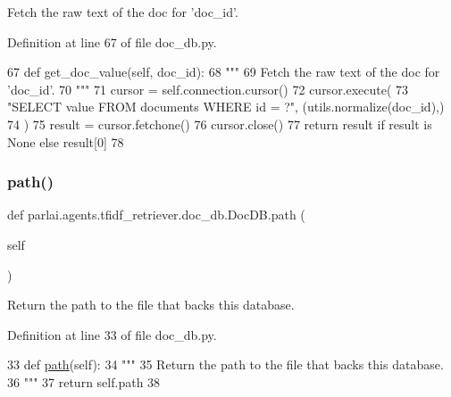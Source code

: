 \begin{DoxyVerb}Fetch the raw text of the doc for 'doc_id'.
\end{DoxyVerb}
 

Definition at line 67 of file doc\+\_\+db.\+py.


\begin{DoxyCode}
67     \textcolor{keyword}{def }get\_doc\_value(self, doc\_id):
68         \textcolor{stringliteral}{"""}
69 \textcolor{stringliteral}{        Fetch the raw text of the doc for 'doc\_id'.}
70 \textcolor{stringliteral}{        """}
71         cursor = self.connection.cursor()
72         cursor.execute(
73             \textcolor{stringliteral}{"SELECT value FROM documents WHERE id = ?"}, (utils.normalize(doc\_id),)
74         )
75         result = cursor.fetchone()
76         cursor.close()
77         \textcolor{keywordflow}{return} result \textcolor{keywordflow}{if} result \textcolor{keywordflow}{is} \textcolor{keywordtype}{None} \textcolor{keywordflow}{else} result[0]
78 
\end{DoxyCode}
\mbox{\label{classparlai_1_1agents_1_1tfidf__retriever_1_1doc__db_1_1DocDB_ae3e27c7f804ec3216553b963a0c4e570}} 
\subsubsection{\texorpdfstring{path()}{path()}}
{\footnotesize\ttfamily def parlai.\+agents.\+tfidf\+\_\+retriever.\+doc\+\_\+db.\+Doc\+D\+B.\+path (\begin{DoxyParamCaption}\item[{}]{self }\end{DoxyParamCaption})}

\begin{DoxyVerb}Return the path to the file that backs this database.
\end{DoxyVerb}
 

Definition at line 33 of file doc\+\_\+db.\+py.


\begin{DoxyCode}
33     \textcolor{keyword}{def }\hyperlink{namespacegenerate__task__READMEs_ae2eccad91867a8cb484ed9d5d92187e1}{path}(self):
34         \textcolor{stringliteral}{"""}
35 \textcolor{stringliteral}{        Return the path to the file that backs this database.}
36 \textcolor{stringliteral}{        """}
37         \textcolor{keywordflow}{return} self.path
38 
\end{DoxyCode}


